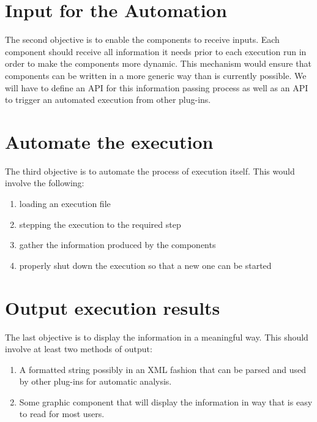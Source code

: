 \section{Input for the Automation}
\label{section:AutoTaskInput}
The second objective is to enable the components to receive inputs.
Each component should receive all information it needs prior to each execution
run in order to make the components more dynamic. This mechanism would ensure
that components can be written in a more generic way than is currently possible.
We will have to define an API for this information passing process as well as
an API to trigger an automated execution from other plug-ins.


\section{Automate the execution}
\label{section:AutoTaskExecution}
The third objective is to automate the process of execution itself. This would
involve the following:
\begin{enumerate}
  \item loading an execution file
  \item stepping the execution to the required step
  \item gather the information produced by the components
  \item properly shut down the execution so that a new one can be started
\end{enumerate}


\section{Output execution results}
\label{section:AutoTaskOutput}
The last objective is to display the information in a meaningful way.
This should involve at least two methods of output:
\begin{enumerate}
  \item A formatted string possibly in an XML fashion that can be parsed and
  used by other plug-ins for automatic analysis.
  \item Some graphic component that will display the information in way that is
  easy to read for most users.
\end{enumerate}

